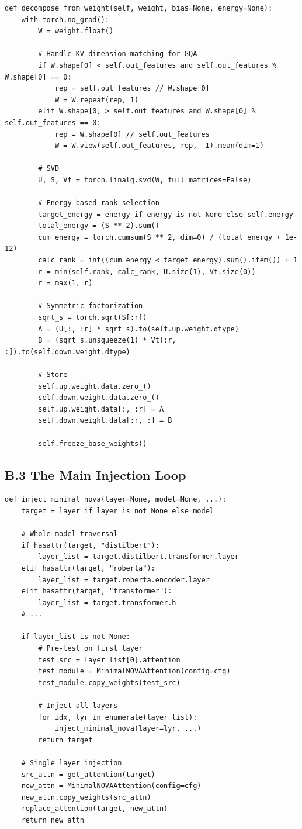 \begin{lstlisting}
def decompose_from_weight(self, weight, bias=None, energy=None):
    with torch.no_grad():
        W = weight.float()
        
        # Handle KV dimension matching for GQA
        if W.shape[0] < self.out_features and self.out_features % W.shape[0] == 0:
            rep = self.out_features // W.shape[0]
            W = W.repeat(rep, 1)
        elif W.shape[0] > self.out_features and W.shape[0] % self.out_features == 0:
            rep = W.shape[0] // self.out_features
            W = W.view(self.out_features, rep, -1).mean(dim=1)
        
        # SVD
        U, S, Vt = torch.linalg.svd(W, full_matrices=False)
        
        # Energy-based rank selection
        target_energy = energy if energy is not None else self.energy
        total_energy = (S ** 2).sum()
        cum_energy = torch.cumsum(S ** 2, dim=0) / (total_energy + 1e-12)
        calc_rank = int((cum_energy < target_energy).sum().item()) + 1
        r = min(self.rank, calc_rank, U.size(1), Vt.size(0))
        r = max(1, r)
        
        # Symmetric factorization
        sqrt_s = torch.sqrt(S[:r])
        A = (U[:, :r] * sqrt_s).to(self.up.weight.dtype)
        B = (sqrt_s.unsqueeze(1) * Vt[:r, :]).to(self.down.weight.dtype)
        
        # Store
        self.up.weight.data.zero_()
        self.down.weight.data.zero_()
        self.up.weight.data[:, :r] = A
        self.down.weight.data[:r, :] = B
        
        self.freeze_base_weights()
\end{lstlisting}

\subsection{B.3 The Main Injection Loop}

\begin{lstlisting}
def inject_minimal_nova(layer=None, model=None, ...):
    target = layer if layer is not None else model
    
    # Whole model traversal
    if hasattr(target, "distilbert"):
        layer_list = target.distilbert.transformer.layer
    elif hasattr(target, "roberta"):
        layer_list = target.roberta.encoder.layer
    elif hasattr(target, "transformer"):
        layer_list = target.transformer.h
    # ...
    
    if layer_list is not None:
        # Pre-test on first layer
        test_src = layer_list[0].attention
        test_module = MinimalNOVAAttention(config=cfg)
        test_module.copy_weights(test_src)
        
        # Inject all layers
        for idx, lyr in enumerate(layer_list):
            inject_minimal_nova(layer=lyr, ...)
        return target
    
    # Single layer injection
    src_attn = get_attention(target)
    new_attn = MinimalNOVAAttention(config=cfg)
    new_attn.copy_weights(src_attn)
    replace_attention(target, new_attn)
    return new_attn
\end{lstlisting}

